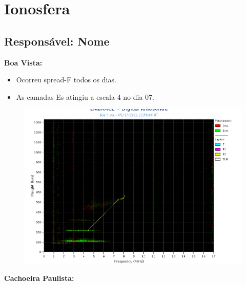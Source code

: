 \documentclass[a4paper, 10pt]{article}
\begin{document}
\section{Ionosfera} 
 \subsection{Responsável: Nome} 
 
\textbf{Boa Vista: }

 \begin{itemize}
\item Ocorreu spread-F todos os dias.
\item As camadas Es atingiu a escala 4 no dia 07.
\end{itemize}
\begin{figure}[H]
    \centering
    \includegraphics[width=14cm]{./figures//BoaVista.png}
\end{figure}

\textbf{Cachoeira Paulista:}
\end{document}
